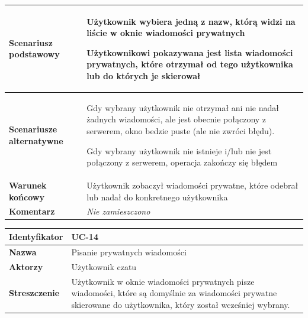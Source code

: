 {\begin{tabular}{ | l | l | }
	\hline
		\parbox[t]{4cm}{\textbf{Scenariusz podstawowy}} & \parbox[t]{11cm}{
			\begin{enumreq}
				\item Użytkownik wybiera jedną z nazw, którą widzi na
				liście w oknie wiadomości prywatnych
				\item Użytkownikowi pokazywana jest lista wiadomości
				prywatnych, które otrzymał od tego użytkownika lub
				do których je skierował
			\end{enumreq}
		}
		\\
		
	\hline
		\parbox[t]{4cm}{\textbf{Scenariusze alternatywne}} & \parbox[t]
		{11cm}{
			\begin{enumreq}
				\item Gdy wybrany użytkownik nie otrzymał ani nie nadał żadnych
				wiadomości, ale jest obecnie połączony z serwerem, okno
				bedzie puste (ale nie zwróci błędu).
				\item Gdy wybrany użytkownik nie istnieje i/lub nie jest
				połączony z serwerem, operacja zakończy się błędem
			\end{enumreq}
		}
		\\
		
	\hline
		\parbox[t]{4cm}{\textbf{Warunek końcowy}} & \parbox[t]{11cm}{
			Użytkownik zobaczył wiadomości prywatne, które odebrał lub nadał
			do konkretnego użytkownika
		}
		\\
		
	\hline
		\parbox[t]{4cm}{\textbf{Komentarz}} & \parbox[t]{11cm}{
			\textit{Nie zamieszczono}
		}
		\\

	\hline
\end{tabular}

\vspace{2em}

\begin{tabular}{ | l | l | }
	\hline
		\textbf{Identyfikator} & 
		UC-14
		\\
		
	\hline
		\textbf{Nazwa} & 
		Pisanie prywatnych wiadomości
		\\
		
	\hline
		\textbf{Aktorzy} & \parbox[t]{11cm}{
			Użytkownik czatu
		}\\
		 
	\hline
		\parbox[t]{4cm}{\textbf{Streszczenie}} & \parbox[t]{11cm}{
			Użytkownik w oknie wiadomości prywatnych pisze wiadomości,
			które są domyślnie za wiadomości prywatne skierowane do
			użytkownika, który został wcześniej wybrany.
			
}
\end{tabular}}
